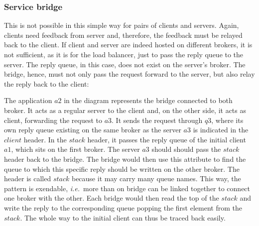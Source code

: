 \documentclass[a4paper]{scrartcl}
\newcommand\ie{\textit{i.e.}}
\newcommand{\connect}[2]{
\draw [->,color=black] (#1) to (#2)
}
\begin{document}
\subsubsection{Service bridge}\label{subsub:bridge}
This is not possible in this simple way for pairs of clients and servers.
Again, clients need feedback from server and, therefore,
the feedback must be relayed back to the client.
If client and server are indeed hosted on different brokers,
it is not sufficient, as it is for the load balancer,
just to pass the reply queue to the server.
The reply queue, in this case, does not exist on
the server's broker.
The bridge, hence, must not only pass the request forward to the server,
but also relay the reply back to the client:


The application $a2$ in the diagram represents the bridge
connected to both broker.
It acts as a regular server to the client and,
on the other side, it acts as client, forwarding
the request to $a3$.
It sends the request through $q3$, where its own reply queue
existing on the same broker as the server $a3$
is indicated in the $client$ header.
In the $stack$ header,
it passes the reply queue of the initial client $a1$,
which sits on the first broker.
The server $a3$ should should pass the $stack$ header
back to the bridge. The bridge would then use
this attribute to find the queue to which this 
specific reply should be written on the other broker.
The header is called $stack$ because it may carry
many queue names. This way, the pattern is exendable,
\ie\ more than on bridge can be linked together
to connect one broker with the other.
Each bridge would then read the top of the $stack$ and
write the reply to the corresponding queue
popping the first element from the $stack$.
The whole way to the initial client
can thus be traced back easily. 
\end{document}
